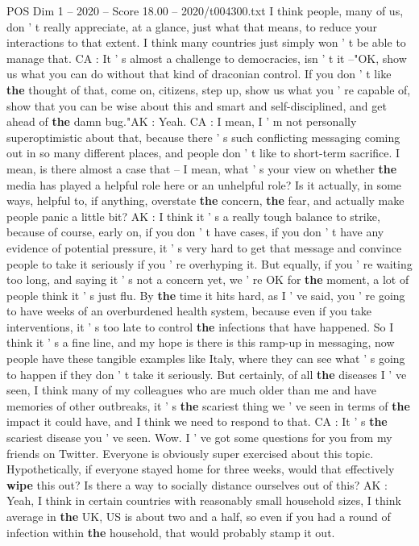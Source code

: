 \begin{textsample}{POS Dim 1 – 2020 – Score 18.00 – 2020/t004300.txt}
I think people, many of us, don ' t really appreciate, at a glance, just what that means, to reduce your interactions to that extent.
I think many countries just simply won ' t be able to manage that.
CA : It ' s almost a challenge to democracies, isn ' t it --"OK, show us what you can do without that kind of draconian control.
If you don ' t like \textbf{the} thought of that, come on, citizens, step up, show us what you ' re capable of, show that you can be wise about this and smart and self-disciplined, and get ahead of \textbf{the} damn bug."AK : Yeah.
CA : I mean, I ' m not personally superoptimistic about that, because there ' s such conflicting messaging coming out in so many different places, and people don ' t like to short-term sacrifice.
I mean, is there almost a case that -- I mean, what ' s your view on whether \textbf{the} media has played a helpful role here or an unhelpful role?
Is it actually, in some ways, helpful to, if anything, overstate \textbf{the} concern, \textbf{the} fear, and actually make people panic a little bit?
AK : I think it ' s a really tough balance to strike, because of course, early on, if you don ' t have cases, if you don ' t have any evidence of potential pressure, it ' s very hard to get that message and convince people to take it seriously if you ' re overhyping it.
But equally, if you ' re waiting too long, and saying it ' s not a concern yet, we ' re OK for \textbf{the} moment, a lot of people think it ' s just flu.
By \textbf{the} time it hits hard, as I ' ve said, you ' re going to have weeks of an overburdened health system, because even if you take interventions, it ' s too late to control \textbf{the} infections that have happened.
So I think it ' s a fine line, and my hope is there is this ramp-up in messaging, now people have these tangible examples like Italy, where they can see what ' s going to happen if they don ' t take it seriously.
But certainly, of all \textbf{the} diseases I ' ve seen, I think many of my colleagues who are much older than me and have memories of other outbreaks, it ' s \textbf{the} scariest thing we ' ve seen in terms of \textbf{the} impact it could have, and I think we need to respond to that.
CA : It ' s \textbf{the} scariest disease you ' ve seen.
Wow.
I ' ve got some questions for you from my friends on Twitter.
Everyone is obviously super exercised about this topic.
Hypothetically, if everyone stayed home for three weeks, would that effectively \textbf{wipe} this out?
Is there a way to socially distance ourselves out of this?
AK : Yeah, I think in certain countries with reasonably small household sizes, I think average in \textbf{the} UK, US is about two and a half, so even if you had a round of infection within \textbf{the} household, that would probably stamp it out.

\end{textsample}
